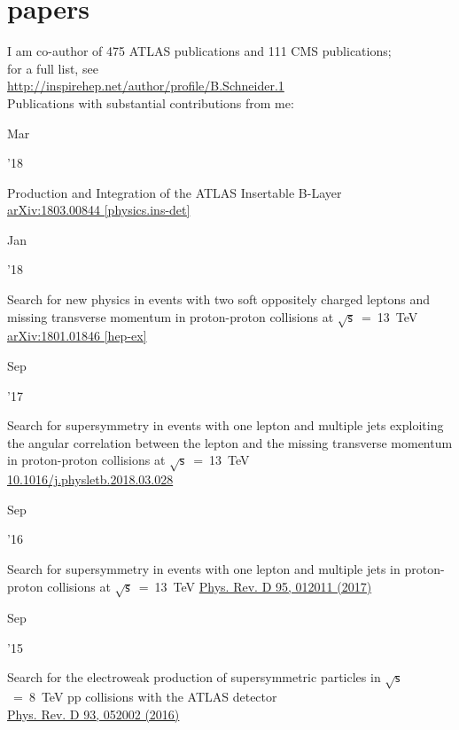 \documentclass[]{cv} %
\begin{document}
\section{papers}
\begin{entrylist}

  \entry
  {}
  {I am co-author of 475 ATLAS publications and 111 CMS publications;\\
  for a full list, see \\
    \href{http://inspirehep.net/author/profile/B.Schneider.1}{http://inspirehep.net/author/profile/B.Schneider.1}\\
  Publications with substantial contributions from me:}
  {}
  {\vspace*{\spacingPubs}}

  \entry
  {\parbox[t]{\parboxWidthOne}{Mar}\parbox[t]{\parboxWidthTwo}{\hfill '18}}
  {Production and Integration of the ATLAS Insertable B-Layer\\}
    {\href{https://arxiv.org/abs/1803.00844}{arXiv:1803.00844 [physics.ins-det]}}
  {\vspace*{\spacingPubs}}

  \entry
  {\parbox[t]{\parboxWidthOne}{Jan}\parbox[t]{\parboxWidthTwo}{\hfill '18}}
  {Search for new physics in events with two soft oppositely charged leptons and missing transverse momentum in proton-proton collisions at $\sqrt{\mathsf{s}}$~=~13~TeV}
    {\href{https://arxiv.org/abs/1801.01846}{arXiv:1801.01846 [hep-ex]}}
  {\vspace*{\spacingPubs}}

  \entry
  {\parbox[t]{\parboxWidthOne}{Sep}\parbox[t]{\parboxWidthTwo}{\hfill '17}}
  {Search for supersymmetry in events with one lepton and multiple jets exploiting the angular correlation between the lepton and the missing transverse momentum in proton-proton collisions at $\sqrt{\mathsf{s}}$~=~13~TeV\\}
    {\href{http://dx.doi.org/10.1016/j.physletb.2018.03.028}{10.1016/j.physletb.2018.03.028}}
  {\vspace*{\spacingPubs}}

  \entry
  {\parbox[t]{\parboxWidthOne}{Sep}\parbox[t]{\parboxWidthTwo}{\hfill '16}}
  {Search for supersymmetry in events with one lepton and multiple jets in proton-proton collisions at $\sqrt{\mathsf{s}}$~=~13~TeV}
    {\href{https://journals.aps.org/prd/abstract/10.1103/PhysRevD.95.012011}{Phys. Rev. D 95, 012011 (2017)}}
  {\vspace*{\spacingPubs}}

  \entry
  {\parbox[t]{\parboxWidthOne}{Sep}\parbox[t]{\parboxWidthTwo}{\hfill '15}}
  {Search for the electroweak production of supersymmetric particles in
    $\sqrt{\mathsf{s}}$~=~8~TeV pp collisions with the ATLAS detector\\}
    {\href{https://journals.aps.org/prd/abstract/10.1103/PhysRevD.93.052002}{Phys. Rev. D 93, 052002 (2016)}}
  {\vspace*{\spacingPubs}}


\end{entrylist}
\end{document}
